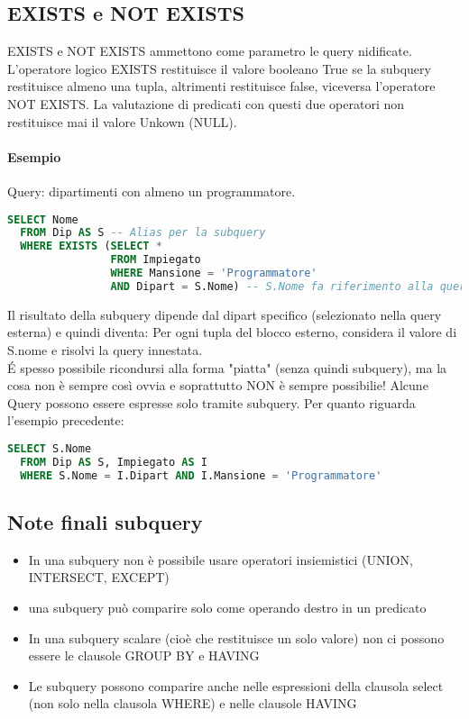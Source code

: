 \subsection{EXISTS e NOT EXISTS}
EXISTS e NOT EXISTS ammettono come parametro le query nidificate. L'operatore logico
EXISTS restituisce il valore booleano True se la subquery restituisce almeno una tupla,
altrimenti restituisce false, viceversa l'operatore NOT EXISTS. La valutazione
di predicati con questi due operatori non restituisce mai il valore Unkown (NULL).
\paragraph*{Esempio} Query: dipartimenti con almeno un programmatore.
\begin{lstlisting}[language=SQL]
  SELECT Nome
  FROM Dip AS S -- Alias per la subquery
  WHERE EXISTS (SELECT *
                FROM Impiegato
                WHERE Mansione = 'Programmatore'
                AND Dipart = S.Nome) -- S.Nome fa riferimento alla query esterna
\end{lstlisting}
Il risultato della subquery dipende dal dipart specifico (selezionato nella query esterna) e quindi
diventa: Per ogni tupla del blocco esterno, considera il valore di S.nome e risolvi la query
innestata.\\
\'E spesso possibile ricondursi alla forma "piatta" (senza quindi subquery), ma la cosa
non è sempre così ovvia e soprattutto NON è sempre possibilie! Alcune Query possono essere espresse solo
tramite subquery. Per quanto riguarda l'esempio precedente:
\begin{lstlisting}[language=SQL]
  SELECT S.Nome
  FROM Dip AS S, Impiegato AS I
  WHERE S.Nome = I.Dipart AND I.Mansione = 'Programmatore'
\end{lstlisting}
\subsection{Note finali subquery}
\begin{itemize}
  \item In una subquery non è possibile usare operatori insiemistici (UNION, INTERSECT, EXCEPT)
  \item una subquery può comparire solo come operando destro in un predicato
  \item In una subquery scalare (cioè che restituisce un solo valore)
   non ci possono essere le clausole GROUP BY e HAVING
  \item Le subquery possono comparire anche nelle espressioni della clausola select (non solo
  nella clausola WHERE) e nelle clausole HAVING
\end{itemize}
